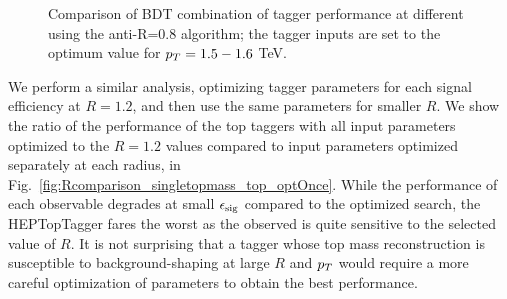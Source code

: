 \begin{figure}
\begin{center}
\caption{Comparison of BDT combination of tagger performance at different \pt using the anti-\kT R=0.8 algorithm; the tagger inputs are set to the optimum value for $p_T=1.5-1.6$ TeV.}
\label{fig:ptcomparison_top_optOnce}
\end{center}
\end{figure}

 We perform a similar analysis, optimizing tagger parameters for each signal efficiency at $R=1.2$, and then use the same parameters for smaller $R$. We show the ratio of the performance of the top taggers with all input parameters optimized to the $R=1.2$ values compared to input parameters optimized separately at each radius, in Fig.~\ref{fig:Rcomparison_singletopmass_top_optOnce}. While the performance of each observable degrades at small $\epsilon_{\rm sig}$ compared to the optimized search, the HEPTopTagger fares the worst as the observed is quite sensitive to the selected value of $R$. It is not surprising that a tagger whose top mass reconstruction is susceptible to background-shaping at large $R$ and $p_T$ would require a more careful optimization of parameters to obtain the best performance.

